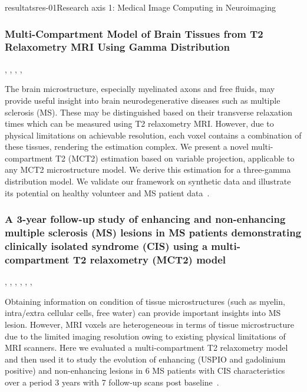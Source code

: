 \documentclass{ra2018}
\begin{document}
\begin{module}{resultats}{res-01}{Research axis 1: Medical Image Computing in Neuroimaging}
\subsubsection{Multi-Compartment Model of Brain Tissues from T2 Relaxometry MRI Using Gamma Distribution}
\begin{participants}
      , 
      ,
      ,
      ,
\end{participants}
The brain microstructure, especially myelinated axons and free fluids, may provide useful insight into brain neurodegenerative diseases such as multiple sclerosis (MS). These may be distinguished based on their transverse relaxation times which can be measured using T2 relaxometry MRI. However, due to physical limitations on achievable resolution, each voxel contains a combination of these tissues, rendering the estimation complex. We present a novel multi-compartment T2 (MCT2) estimation based on variable projection, applicable to any MCT2 microstructure model. We derive this estimation for a three-gamma distribution model. We validate our framework on synthetic data and illustrate its potential on healthy volunteer and MS patient data~\cite{chatterjee:hal-01744852}.

\subsubsection{A 3-year follow-up study of enhancing and non-enhancing multiple sclerosis (MS) lesions in MS patients demonstrating clinically isolated syndrome (CIS) using a multi-compartment T2 relaxometry (MCT2) model}
\begin{participants}
      , 
      ,
      ,
      ,
      ,
      ,
\end{participants}
Obtaining information on condition of tissue microstructures (such as myelin, intra/extra cellular cells, free water) can provide important insights into MS lesion. However, MRI voxels are heterogeneous in terms of tissue microstructure due to the limited imaging resolution owing to existing physical limitations of MRI scanners. Here we evaluated a multi-compartment T2 relaxometry model and then used it to study the evolution of enhancing (USPIO and gadolinium positive) and non-enhancing lesions in 6 MS patients with CIS characteristics over a period 3 years with 7 follow-up scans post baseline~\cite{chatterjee:hal-01821694}.


\end{module}
\end{document}
